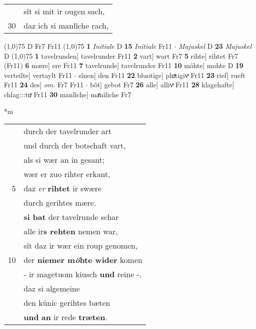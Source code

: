 \documentclass[8pt,a4paper,notitlepage]{article}
\begin{document}
\begin{table}[ht]
\begin{minipage}[t]{0.5\linewidth}
\begin{tabular}{rl}
 & sît si mit ir ougen sach,\\ 
30 & daz ich si manlîche rach,\\ 
\end{tabular}
\scriptsize
\line(1,0){75} \newline
D Fr7 Fr11 \newline
\line(1,0){75} \newline
\textbf{1} \textit{Initiale} D  \textbf{15} \textit{Initiale} Fr11   $\cdot$ \textit{Majuskel} D  \textbf{23} \textit{Majuskel} D  \newline
\line(1,0){75} \newline
\textbf{1} tavelrunden] tavelrunder Fr11 \textbf{2} vart] wart Fr7 \textbf{5} rihte] rihtet Fr7 (Fr11) \textbf{6} mære] ere Fr11 \textbf{7} tavelrunde] tavelrunder Fr11 \textbf{10} möhte] mohte D \textbf{19} verteilte] vertaylt Fr11  $\cdot$ sînen] den Fr11 \textbf{22} bluotige] pluͯtigivͯ Fr11 \textbf{23} rief] rueft Fr11 \textbf{24} des] \textit{om.} Fr7 Fr11  $\cdot$ bôt] gebot Fr7 \textbf{26} alle] allivͯ Fr11 \textbf{28} klagehafte] chlag:::tuͯ Fr11 \textbf{30} manlîche] maͤniliche Fr7 \newline
\end{minipage}
\hspace{0.5cm}
\begin{minipage}[t]{0.5\linewidth}
\small
\begin{center}*m
\end{center}
\begin{tabular}{rl}
 & durch der tavelrunder art\\ 
 & und durch der botschaft vart,\\ 
 & als si wær an in gesant;\\ 
 & wær er zuo rihter erkant,\\ 
5 & daz \textit{er} \textbf{rihtet} ir swære\\ 
 & durch gerihtes mære.\\ 
 & \textbf{si bat} der tavelrunde schar\\ 
 & alle ir\textbf{s rehten} nemen war,\\ 
 & sît daz ir wær ein roup genomen,\\ 
10 & der \textbf{niemer m\textit{ö}hte wider} komen\\ 
 & - ir magetuom kiusch \textbf{und} reine -,\\ 
 & daz si algemeine\\ 
 & den künic gerihtes bæten\\ 
 & \textbf{und} \textbf{an} ir rede \textbf{træten}.\\ 

\end{tabular}
\end{minipage}
\end{table}
\end{document}
